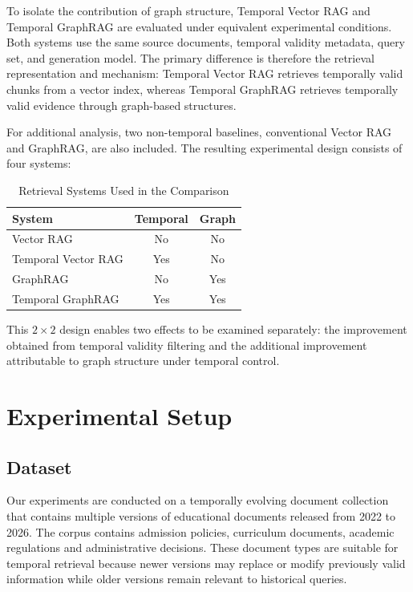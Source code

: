 \documentclass[conference]{IEEEtran}
\numberwithin{equation}{section}
\begin{document}
To isolate the contribution of graph structure, Temporal Vector RAG and Temporal GraphRAG are evaluated under equivalent experimental conditions. Both systems use the same source documents, temporal validity metadata, query set, and generation model. The primary difference is therefore the retrieval representation and mechanism: Temporal Vector RAG retrieves temporally valid chunks from a vector index, whereas Temporal GraphRAG retrieves temporally valid evidence through graph-based structures.

For additional analysis, two non-temporal baselines, conventional Vector RAG and GraphRAG, are also included. The resulting experimental design consists of four systems:

\begin{table}[htbp]
\caption{Retrieval Systems Used in the Comparison}
\label{tab:systems}
\centering
\begin{tabular}{lcc}
\hline
\textbf{System} & \textbf{Temporal} & \textbf{Graph} \\
\hline
Vector RAG & No & No \\
Temporal Vector RAG & Yes & No \\
GraphRAG & No & Yes \\
Temporal GraphRAG & Yes & Yes \\
\hline
\end{tabular}
\end{table}

This $2\times2$ design enables two effects to be examined separately: the improvement obtained from temporal validity filtering and the additional improvement attributable to graph structure under temporal control.


\section{Experimental Setup}

\subsection{Dataset}

Our experiments are conducted on a temporally evolving document collection that contains multiple versions of educational documents released from 2022 to 2026. The corpus contains admission policies, curriculum documents, academic regulations and administrative decisions. These document types are suitable for temporal retrieval because newer versions may replace or modify previously valid information while older versions remain relevant to historical queries.
\end{document}
